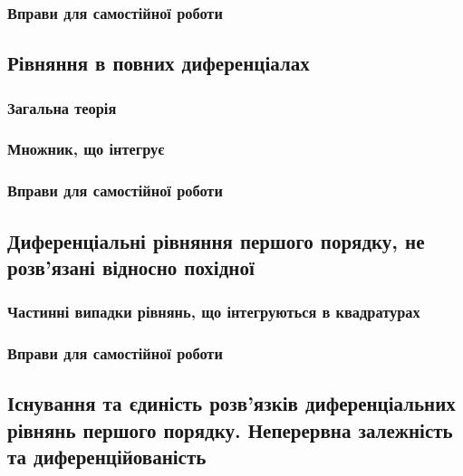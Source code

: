		\subsubsection{Вправи для самостійної роботи}
		

	\subsection{Рівняння в повних диференціалах}
	

		\subsubsection{Загальна теорія}
		

		\subsubsection{Множник, що інтегрує}
		

		\subsubsection{Вправи для самостійної роботи}
		

	\subsection{Диференціальні рівняння першого порядку, не розв’язані відносно похідної}
	

		\subsubsection{Частинні випадки рівнянь, що інтегруються в квадратурах}
		

		\subsubsection{Вправи для самостійної роботи}
		

	\subsection{Існування та єдиність розв’язків диференціальних рівнянь першого порядку. Неперервна залежність та диференційованість}
	


